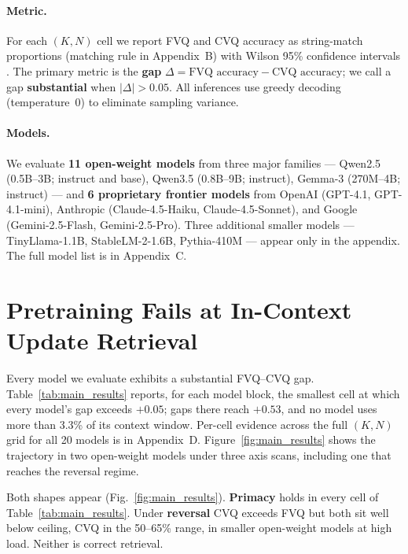 \documentclass[letterpaper]{article} %
\begin{document}
\paragraph{Metric.}
For each $(K, N)$ cell we report FVQ and CVQ accuracy as
string-match proportions (matching rule in
Appendix~B) with Wilson 95\% confidence intervals
\citep{wilson1927}.
The primary metric is the \textbf{gap}
$\Delta = \text{FVQ accuracy} - \text{CVQ accuracy}$; we call a gap
\textbf{substantial} when $|\Delta| > 0.05$.
All inferences use greedy decoding (temperature~0) to eliminate
sampling variance.

\paragraph{Models.}
We evaluate \textbf{11 open-weight models} from three major
families --- Qwen2.5 (0.5B--3B; instruct and base), Qwen3.5
(0.8B--9B; instruct), Gemma-3 (270M--4B; instruct) --- and \textbf{6
proprietary frontier models} from OpenAI (GPT-4.1, GPT-4.1-mini),
Anthropic (Claude-4.5-Haiku, Claude-4.5-Sonnet), and Google
(Gemini-2.5-Flash, Gemini-2.5-Pro).
Three additional smaller models --- TinyLlama-1.1B, StableLM-2-1.6B,
Pythia-410M --- appear only in the appendix.
The full model list is in Appendix~C.

\section{Pretraining Fails at In-Context Update Retrieval}
\label{sec:failure}

Every model we evaluate exhibits a substantial FVQ--CVQ gap.
Table~\ref{tab:main_results} reports, for each model block, the
smallest cell at which every model's gap exceeds $+0.05$; gaps
there reach $+0.53$, and no model uses more than 3.3\% of its
context window.
Per-cell evidence across the full $(K, N)$ grid for all 20 models is
in Appendix~D.
Figure~\ref{fig:main_results} shows the trajectory in two open-weight
models under three axis scans, including one that reaches the
reversal regime.

Both shapes appear (Fig.~\ref{fig:main_results}).
\textbf{Primacy} holds in every cell of
Table~\ref{tab:main_results}. Under \textbf{reversal} CVQ exceeds
FVQ but both sit well below ceiling, CVQ in the 50--65\% range, in
smaller open-weight models at high load. Neither is correct
retrieval.
\end{document}
